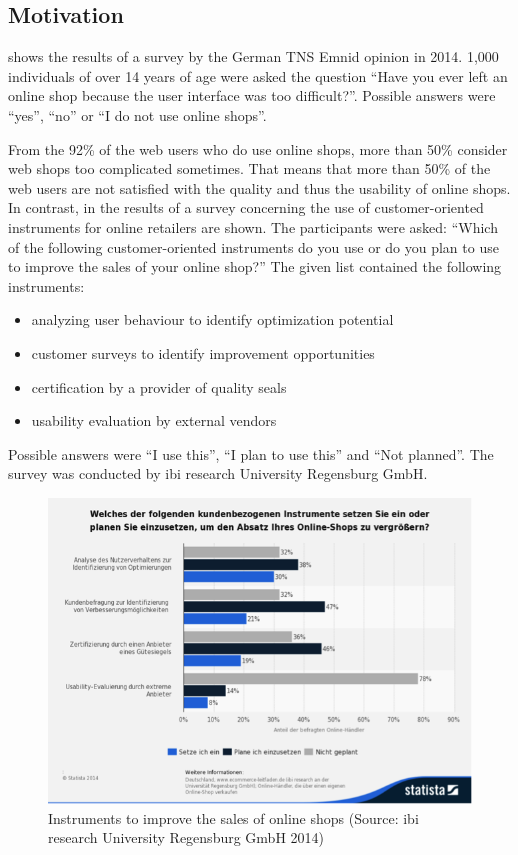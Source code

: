 \documentclass[output=paper]{langsci/langscibook}
\begin{document}
\subsection{Motivation}

 shows the results of a survey by the German TNS Emnid opinion in 2014. 1,000 individuals of over 14 years of age were asked the question ``Have you ever left an online shop because the user interface was too difficult?''. Possible answers were ``yes'', ``no'' or ``I do not use online shops''.


From the 92\% of the web users who do use online shops, more than 50\% consider web shops too complicated sometimes. That means that more than 50\% of the web users are not satisfied with the quality and thus the usability of online shops. In contrast, in  the results of a survey concerning the use of customer-oriented instruments for online retailers are shown. The participants were asked: ``Which of the following customer-oriented instruments do you use or do you plan to use to improve the sales of your online shop?'' The given list contained the following instruments:


\begin{itemize}
\item analyzing user behaviour to identify optimization potential 
\item customer surveys to identify improvement opportunities 
\item certification by a provider of quality seals 
\item usability evaluation by external vendors 
\end{itemize}

Possible answers were ``I use this'', ``I plan to use this'' and ``Not planned''. The survey was conducted by ibi research University Regensburg GmbH. 

\begin{figure}
 \includegraphics[width=\textwidth]{figures/Roesener2.png}
 \caption{Instruments to improve the sales of online shops (Source: ibi research University Regensburg GmbH 2014)}
 \label{roesener:fig:2}
\end{figure} 
\end{document}
